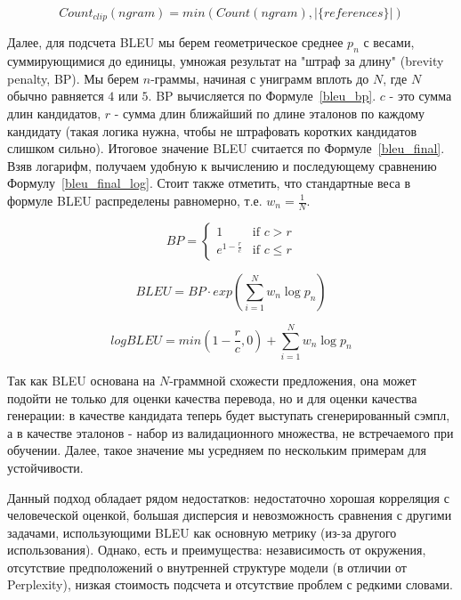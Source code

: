 \documentclass{spbau-diploma}
\begin{document}
\begin{equation}
\label{bleu_countclip}
Count_{clip}(ngram) = min(Count(ngram), |\{references\}|)
\end{equation}

Далее, для подсчета BLEU мы берем геометрическое среднее $p_n$ с весами, 
суммирующимися до единицы, умножая результат на "штраф за длину" 
(brevity penalty, BP). Мы берем $n$-граммы, начиная с униграмм вплоть до $N$, 
где $N$ обычно равняется $4$ или $5$. BP вычисляется по Формуле~\ref{bleu_bp}. 
$c$ - это сумма длин кандидатов, $r$ - сумма длин ближайший по длине эталонов 
по каждому кандидату (такая логика нужна, чтобы не штрафовать коротких 
кандидатов слишком сильно). Итоговое значение BLEU считается по 
Формуле~\ref{bleu_final}. 
Взяв логарифм, получаем удобную к вычислению и последующему
сравнению Формулу~\ref{bleu_final_log}. Стоит также отметить, что стандартные 
веса в формуле BLEU распределены равномерно, т.е. $w_n = \frac{1}{N}$.

\begin{equation}
\label{bleu_bp}
BP = 
\begin{cases}
1 &\text{if } c > r\\
e^{1 - \frac{r}{c}} &\text{if } c \leqslant r
\end{cases}
\end{equation}

\begin{equation}
\label{bleu_final}
BLEU = BP \cdot exp(\sum^{N}_{i=1}{w_n \log{p_n}})
\end{equation}

\begin{equation}
\label{bleu_final_log}
log BLEU = min(1 - \frac{r}{c}, 0) + \sum^{N}_{i=1}{w_n \log{p_n}}
\end{equation}

Так как BLEU основана на $N$-граммной схожести предложения, она может подойти
не только для оценки качества перевода, но и для оценки качества генерации: в 
качестве кандидата теперь будет выступать сгенерированный сэмпл, а
в качестве эталонов - набор из валидационного множества, не встречаемого при
обучении. Далее, такое значение мы усредняем по нескольким примерам для 
устойчивости.

Данный подход обладает рядом недостатков: недостаточно хорошая корреляция с 
человеческой оценкой, большая дисперсия и невозможность сравнения с другими 
задачами, использующими BLEU как основную метрику (из-за другого использования). 
Однако, есть и преимущества: независимость от окружения, 
отсутствие предположений о внутренней структуре модели 
(в отличии от Perplexity), низкая стоимость подсчета и отсутствие проблем с
редкими словами.
\end{document}
